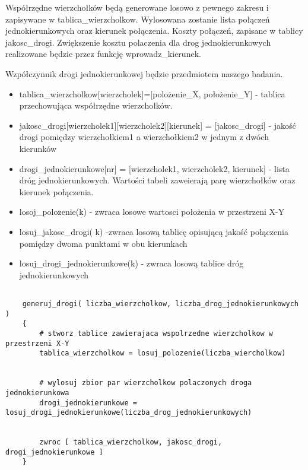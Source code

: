 \documentclass{article}
\begin{document}
Współrzędne wierzchołków będą generowane losowo z pewnego zakresu i zapisywane w tablica\_wierzcholkow. Wylosowana zostanie lista połączeń jednokierunkowych oraz kierunek połączenia. Koszty połączeń, zapisane w tablicy jakosc\_drogi. Zwiększenie kosztu polaczenia dla drog jednokierunkowych realizowane będzie przez funkcję wprowadz\_kierunek.

Wzpółczynnik drogi jednokierunkowej będzie przedmiotem naszego badania. \\

\begin{itemize}
\item tablica\_wierzcholkow[wierzcholek]=[polożenie\_X, położenie\_Y] - tablica przechowująca współrzędne wierzchołków.
\item jakosc\_drogi[wierzcholek1][wierzcholek2][kierunek] = [jakosc\_drogi] - jakość drogi pomiędzy wierzchołkiem1 a wierzchołkiem2 w jednym z dwóch kierunków
\item drogi\_jednokierunkowe[nr] = [wierzcholek1, wierzcholek2, kierunek] - lista dróg jednokierunkowych. Wartości tabeli zaweierają parę wierzchołków oraz kierunek połączenia.
\item losoj\_polozenie(k) -  zwraca losowe wartosci położenia w przestrzeni X-Y
\item losuj\_jakosc\_drogi( k) -zwraca losową tablicę opisującą jakość połączenia pomiędzy dwoma punktami w obu kierunkach
\item losuj\_drogi\_jednokierunkowe(k) - zwraca losową tablice dróg jednokierunkowych
\end{itemize}

\begin{lstlisting}[caption={Funkcja generujaca dane wejsiowe}]

	generuj_drogi( liczba_wierzcholkow, liczba_drog_jednokierunkowych 	)
	{	
		# stworz tablice zawierajaca wspolrzedne wierzcholkow w przestrzeni X-Y
		tablica_wierzcholkow = losuj_polozenie(liczba_wiercholkow)

		
		# wylosuj zbior par wierzcholkow polaczonych droga jednokierunkowa
		drogi_jednokierunkowe = losuj_drogi_jednokierunkowe(liczba_drog_jednokierunkowych)

		
		zwroc [ tablica_wierzcholkow, jakosc_drogi, drogi_jednokierunkowe ]
	}
		

\end{lstlisting}
\end{document}
